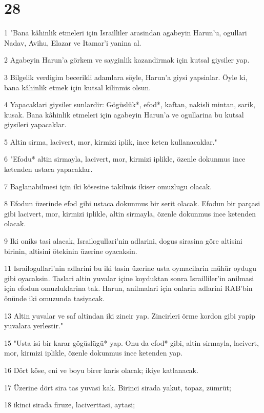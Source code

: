 \chapter{28}

\par 1 "Bana kâhinlik etmeleri için Israilliler arasindan agabeyin Harun'u, ogullari Nadav, Avihu, Elazar ve Itamar'i yanina al.
\par 2 Agabeyin Harun'a görkem ve sayginlik kazandirmak için kutsal giysiler yap.
\par 3 Bilgelik verdigim becerikli adamlara söyle, Harun'a giysi yapsinlar. Öyle ki, bana kâhinlik etmek için kutsal kilinmis olsun.
\par 4 Yapacaklari giysiler sunlardir: Gögüslük*, efod*, kaftan, nakisli mintan, sarik, kusak. Bana kâhinlik etmeleri için agabeyin Harun'a ve ogullarina bu kutsal giysileri yapacaklar.
\par 5 Altin sirma, lacivert, mor, kirmizi iplik, ince keten kullanacaklar."
\par 6 "Efodu* altin sirmayla, lacivert, mor, kirmizi iplikle, özenle dokunmus ince ketenden ustaca yapacaklar.
\par 7 Baglanabilmesi için iki kösesine takilmis ikiser omuzlugu olacak.
\par 8 Efodun üzerinde efod gibi ustaca dokunmus bir serit olacak. Efodun bir parçasi gibi lacivert, mor, kirmizi iplikle, altin sirmayla, özenle dokunmus ince ketenden olacak.
\par 9 Iki oniks tasi alacak, Israilogullari'nin adlarini, dogus sirasina göre altisini birinin, altisini ötekinin üzerine oyacaksin.
\par 11 Israilogullari'nin adlarini bu iki tasin üzerine usta oymacilarin mühür oydugu gibi oyacaksin. Taslari altin yuvalar içine koyduktan sonra Israilliler'in anilmasi için efodun omuzluklarina tak. Harun, anilmalari için onlarin adlarini RAB'bin önünde iki omuzunda tasiyacak.
\par 13 Altin yuvalar ve saf altindan iki zincir yap. Zincirleri örme kordon gibi yapip yuvalara yerlestir."
\par 15 "Usta isi bir karar gögüslügü* yap. Onu da efod* gibi, altin sirmayla, lacivert, mor, kirmizi iplikle, özenle dokunmus ince ketenden yap.
\par 16 Dört köse, eni ve boyu birer karis olacak; ikiye katlanacak.
\par 17 Üzerine dört sira tas yuvasi kak. Birinci sirada yakut, topaz, zümrüt;
\par 18 ikinci sirada firuze, laciverttasi, aytasi;
